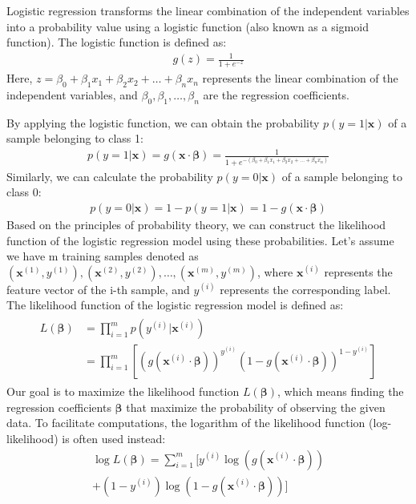 \documentclass[conference]{IEEEconf}
\begin{document}
Logistic regression transforms the linear combination of the independent variables into a probability value using a logistic function (also known as a sigmoid function). The logistic function is defined as:
\begin{eqnarray}
	g(z) = \frac{1}{1 + e^{-z}}
\end{eqnarray}
Here, $z = \beta_0 + \beta_1x_1 + \beta_2x_2 + \ldots + \beta_nx_n$ represents the linear combination of the independent variables, and $\beta_0, \beta_1, \ldots, \beta_n$ are the regression coefficients.

By applying the logistic function, we can obtain the probability $p(y = 1|\mathbf{x})$ of a sample belonging to class 1:
\begin{eqnarray}
p(y = 1|\mathbf{x}) = g(\mathbf{x} \cdot \boldsymbol{\beta}) = \frac{1}{1 + e^{-(\beta_0 + \beta_1x_1 + \beta_2x_2 + \ldots + \beta_nx_n)}}
\end{eqnarray}
Similarly, we can calculate the probability $p(y = 0|\mathbf{x})$ of a sample belonging to class 0:
\begin{eqnarray}
p(y = 0|\mathbf{x}) = 1 - p(y = 1|\mathbf{x}) = 1 - g(\mathbf{x} \cdot \boldsymbol{\beta})
\end{eqnarray}
Based on the principles of probability theory, we can construct the likelihood function of the logistic regression model using these probabilities. Let's assume we have m training samples denoted as $(\mathbf{x}^{(1)}, y^{(1)}), (\mathbf{x}^{(2)}, y^{(2)}), \ldots, (\mathbf{x}^{(m)}, y^{(m)})$, where $\mathbf{x}^{(i)}$ represents the feature vector of the i-th sample, and $y^{(i)}$ represents the corresponding label.
The likelihood function of the logistic regression model is defined as:
\begin{eqnarray}
	\begin{aligned}
	L(\boldsymbol{\beta}) & = \prod_{i=1}^{m} p(y^{(i)}|\mathbf{x}^{(i)}) 
	\\& = \prod_{i=1}^{m} \left[ (g(\mathbf{x}^{(i)} \cdot \boldsymbol{\beta}))^{y^{(i)}} (1 - g(\mathbf{x}^{(i)} \cdot \boldsymbol{\beta}))^{1-y^{(i)}} \right]
	\end{aligned}
\end{eqnarray}
Our goal is to maximize the likelihood function $L(\boldsymbol{\beta})$, which means finding the regression coefficients $\boldsymbol{\beta}$ that maximize the probability of observing the given data. To facilitate computations, the logarithm of the likelihood function (log-likelihood) is often used instead:
\begin{equation}
\begin{split}
	\log L(\boldsymbol{\beta}) = \sum_{i=1}^{m} [y^{(i)} \log(g(\mathbf{x}^{(i)} \cdot \boldsymbol{\beta})) \\
	+ (1-y^{(i)}) \log(1 - g(\mathbf{x}^{(i)} \cdot \boldsymbol{\beta}))]
\end{split}
\end{equation}
\end{document}
